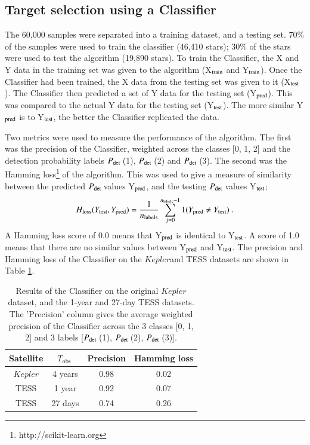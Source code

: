 \documentclass[a4paper,fleqn,usenatbib,useAMS]{mnras}
\newcommand{\kep}{\ensuremath{Kepler}\:}
\newcommand{\pdet}{\ensuremath{P_{\rm det}\:}}
\newcommand{\tobs}{\ensuremath{T_{\textrm{obs}}\:}}
\begin{document}
\subsection{Target selection using a Classifier}
\label{sect: class-results}

The 60,000 samples were separated into a training dataset, and a testing set. 70\% of the samples were used to train the classifier (46,410 stars); 30\% of the stars were used to test the algorithm (19,890 stars). To train the Classifier, the X and Y data in the training set was given to the algorithm (X$_{\rm train}$ and Y$_{\rm train}$). Once the Classifier had been trained, the X data from the testing set was given to it (X$_{\rm test}$). The Classifier then predicted a set of Y data for the testing set (Y$_{\rm pred}$). This was compared to the actual Y data for the testing set (Y$_{\rm test}$). The more similar Y$_{\rm pred}$ is to Y$_{\rm test}$, the better the Classifier replicated the data.

Two metrics were used to measure the performance of the algorithm. The first was the precision of the Classifier, weighted across the classes [0, 1, 2] and the detection probability labels \pdet(1), \pdet(2) and \pdet(3). The second was the Hamming loss\footnote{http://scikit-learn.org} \citep{wegner_technique_1960} of the algorithm. This was used to give a measure of similarity between the predicted \pdet values Y$_{\rm pred}$, and the testing \pdet values Y$_{\rm test}$;
\begin{equation}
H_{\rm loss}(Y_{\rm test}, Y_{\rm pred}) = \frac{1}{n_{\rm labels}} \sum_{j=0}^{n_{\rm labels}-1} 1(Y_{\rm pred} \neq Y_{\rm test}) \: . 
\end{equation}
A Hamming loss score of 0.0 means that Y$_{\rm pred}$ is identical to Y$_{\rm test}$. A score of 1.0 means that there are no similar values between Y$_{\rm pred}$ and Y$_{\rm test}$. The precision and Hamming loss of the Classifier on the \kep and TESS datasets are shown in Table \ref{tab: results}.
\begin{table}
\begin{center}
\begin{tabular}{ |c|c|c|c| }
Satellite & \tobs   & Precision & Hamming loss \\
\hline
\kep      & 4 years & 0.98      & 0.02         \\
TESS      & 1 year  & 0.92      & 0.07         \\
TESS      & 27 days & 0.74      & 0.26         \\
\end{tabular}
\end{center}
\caption{Results of the Classifier on the original \kep dataset, and the 1-year and 27-day TESS datasets. The 'Precision' column gives the average weighted precision of the Classifier across the 3 classes [0, 1, 2] and 3 labels [\pdet(1), \pdet(2), \pdet(3)].}
\label{tab: results}
\end{table}
\end{document}
